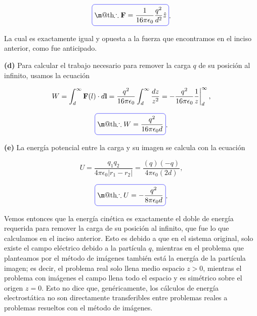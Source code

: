 \documentclass[a4paper,10pt]{article}
\makeatletter
\numberwithin{equation}{section}
\newcommand{\zerodel}{.\kern-\nulldelimiterspace}
\newcommand*{\boxcolor}{blue}
\renewcommand{\boxed}[1]{\textcolor{\boxcolor}{%
\tikz[baseline={([yshift=-1ex]current bounding box.center)}] \node [rectangle, minimum width=1ex,rounded corners,draw] {\normalcolor\m@th$\displaystyle#1$};}}
\makeatother
\begin{document}
\begin{equation}
 \boxed{\therefore \mathbf{F} = \frac{1}{16\pi\epsilon_0}\frac{q^2}{d^2}\hat{z}}.
\end{equation}

La cual es exactamente igual y opuesta a la fuerza que encontramos en el inciso 
anterior, como fue anticipado.

\vspace{.3cm}

\textbf{(d)} Para calcular el trabajo necesario para remover la carga $q$ de su 
posición al infinito, usamos la ecuación 

\begin{equation}
 W = \int_d^\infty \mathbf{F}(l)\cdot d\mathbf{l} = \frac{q^2}{16\pi\epsilon_0}
 \int_d^\infty \frac{dz}{z^2} = \left\zerodel 
 - \frac{q^2}{16\pi\epsilon_0} \frac{1}{z}\right|_d^\infty,
\end{equation}

\begin{equation}
 \boxed{\therefore W = \frac{q^2}{16\pi\epsilon_0d}}.
\end{equation}

\textbf{(e)} La energía potencial entre la carga y su imagen se calcula 
con la ecuación 

\begin{equation}
 U = \frac{q_1q_2}{4\pi\epsilon_0|r_1 - r_2|} = \frac{(q)(-q)}{4\pi\epsilon_0(2d)},
\end{equation}

\begin{equation}
 \boxed{\therefore U = - \frac{q^2}{8\pi\epsilon_0d}}.
\end{equation}

Vemos entonces que la energía cinética es exactamente el doble de energía requerida 
para remover la carga de su posición al infinito, que fue lo que calculamos en el 
inciso anterior. Esto es debido a que en el sistema original, solo existe el 
campo eléctrico debido a la partícula $q$, mientras en el problema que planteamos 
por el método de imágenes también está la energía de la partícula imagen; es decir, 
el problema real solo llena medio espacio $z>0$, mientras el problema con imágenes 
el campo llena todo el espacio y es simétrico sobre el origen $z=0$. Esto no dice que, 
genéricamente, los cálculos de energía electrostática no son directamente transferibles 
entre problemas reales a problemas resueltos con el método de imágenes.

\vspace{.3cm}
\end{document}

